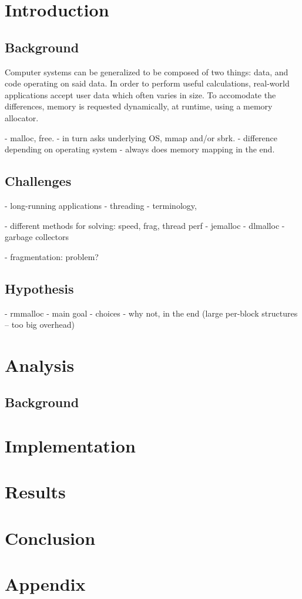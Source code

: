 \documentclass[a4paper,twoside,openany]{report}
\begin{document}
\chapter{Introduction}

\section{Background}

Computer systems can be generalized to be composed of two things: data, and code operating on said data.  In order to
perform useful calculations, real-world applications accept user data which often varies in size.  To accomodate the
differences, memory is requested dynamically, at runtime, using a memory allocator. 

- malloc, free.
    - in turn asks underlying OS, mmap and/or sbrk.
        - difference depending on operating system
    - always does memory mapping in the end.

\section{Challenges}

- long-running applications
- threading
- terminology, 

- different methods for solving: speed, frag, thread perf
- jemalloc
- dlmalloc
- garbage collectors

- fragmentation: problem?

\section{Hypothesis}

- rmmalloc
- main goal
- choices
- why not, in the end (large per-block structures -- too big overhead)

\chapter{Analysis}
\section{Background}

\chapter{Implementation}

\chapter{Results}

\chapter{Conclusion}

\chapter{Appendix}


\clearpage
\end{document}
